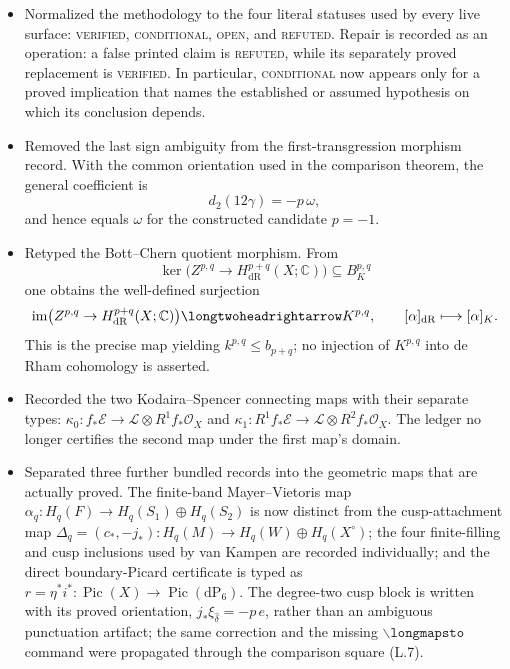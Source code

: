 \begin{itemize}[leftmargin=1.8em]
\item Normalized the methodology to the four literal statuses used by every
live surface: \textsc{verified}, \textsc{conditional}, \textsc{open}, and
\textsc{refuted}.  Repair is recorded as an operation: a false printed claim
is \textsc{refuted}, while its separately proved replacement is
\textsc{verified}.  In particular, \textsc{conditional} now appears only for
a proved implication that names the established or assumed hypothesis on
which its conclusion depends.
\item Removed the last sign ambiguity from the first-transgression morphism
record.  With the common orientation used in the comparison theorem, the
general coefficient is
\[
 d_2(12\gamma)=-p\,\omega,
\]
and hence equals \(\omega\) for the constructed candidate \(p=-1\).
\item Retyped the Bott--Chern quotient morphism.  From
\[
 \ker\bigl(Z^{p,q}\longrightarrow H^{p+q}_{\mathrm{dR}}(X;\mathbb C)\bigr)
 \subseteq B_K^{p,q}
\]
one obtains the well-defined surjection
\[
 \operatorname{im}\bigl(Z^{p,q}\to H^{p+q}_{\mathrm{dR}}(X;\mathbb C)\bigr)
 \longtwoheadrightarrow K^{p,q},
 \qquad [\alpha]_{\mathrm{dR}}\longmapsto[\alpha]_K.
\]
This is the precise map yielding \(k^{p,q}\le b_{p+q}\); no injection of
\(K^{p,q}\) into de Rham cohomology is asserted.
\item Recorded the two Kodaira--Spencer connecting maps with their separate
types: \(\kappa_0:f_*\mathcal E\to\mathcal L\otimes R^1f_*\mathcal O_X\)
and
\(\kappa_1:R^1f_*\mathcal E\to\mathcal L\otimes R^2f_*\mathcal O_X\).
The ledger no longer certifies the second map under the first map's domain.
\item Separated three further bundled records into the geometric maps that
are actually proved.  The finite-band Mayer--Vietoris map
\(\alpha_q:H_q(F)\to H_q(S_1)\oplus H_q(S_2)\) is now distinct from the
cusp-attachment map
\(\Delta_q=(c_*,-j_*):H_q(M)\to H_q(W)\oplus H_q(X^\circ)\); the four
finite-filling and cusp inclusions used by van Kampen are recorded
individually; and the direct boundary-Picard certificate is typed as
\(r=\eta^*i^*:\operatorname{Pic}(X)\to\operatorname{Pic}(\mathrm{dP}_6)\).
The degree-two cusp block is written with its proved orientation,
\(j_*\xi_{\widehat\delta}=-p\,e\), rather than an ambiguous punctuation
artifact; the same correction and the missing \(\backslash\texttt{longmapsto}\)
command were propagated through the comparison square (L.7).
\end{itemize}

